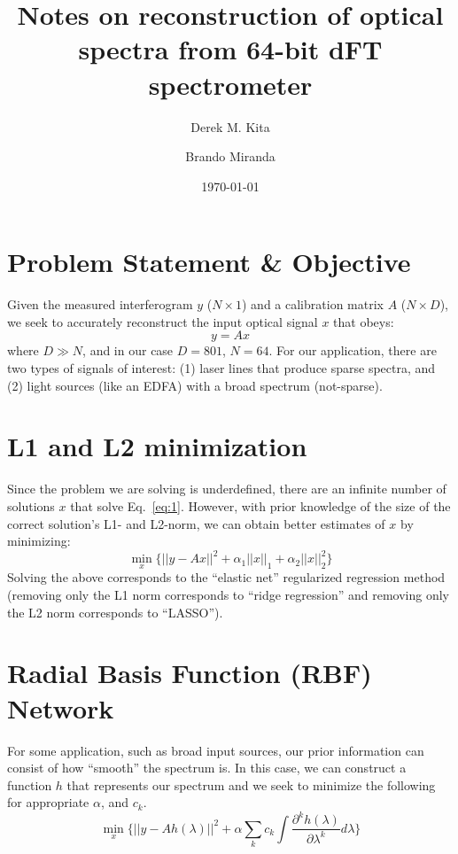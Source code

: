 \documentclass[10pt,a4paper]{article}
\title{Notes on reconstruction of optical spectra from 64-bit dFT spectrometer}
\author[1]{Derek M. Kita}
\author[2]{Brando Miranda}
\affil[1]{Department of Materials Science \& Engineering, Massachusetts Institute of Technology}
\affil[2]{Center for Brains, Minds, and Machines, Massachusetts Institute of Technology}
\date{\today}
\begin{document}
\maketitle

\section*{Problem Statement \& Objective}
Given the measured interferogram $y$ ($N\times 1$) and a calibration matrix $A$ ($N\times D$), we seek to accurately reconstruct the input optical signal $x$ that obeys:
\begin{equation}
y = Ax \label{eq:1}
\end{equation}
where $D\gg N$, and in our case $D=801$, $N=64$.  For our application, there are two types of signals of interest: (1) laser lines that produce sparse spectra, and (2) light sources (like an EDFA) with a broad spectrum (not-sparse).

\section*{L1 and L2 minimization}
Since the problem we are solving is underdefined, there are an infinite number of solutions $x$ that solve Eq.~\ref{eq:1}. However, with prior knowledge of the size of the correct solution's L1- and L2-norm, we can obtain better estimates of $x$ by minimizing:
\begin{equation}
\min_x \Big\{ ||y-Ax||^2 + \alpha_1 ||x||_1 + \alpha_2 ||x||_2^2 \Big\}
\end{equation}
Solving the above corresponds to the ``elastic net'' regularized regression method (removing only the L1 norm corresponds to ``ridge regression'' and removing only the L2 norm corresponds to ``LASSO'').

\section*{Radial Basis Function (RBF) Network}
For some application, such as broad input sources, our prior information can consist of how ``smooth'' the spectrum is.  In this case, we can construct a function $h$ that represents our spectrum and we seek to minimize the following for appropriate $\alpha$, and $c_k$.
\begin{equation}
\min_x \Big\{ ||y-A h(\lambda)||^2 + \alpha \sum_k c_k \int \frac{\partial^k h(\lambda)}{\partial \lambda^k}d\lambda \Big\}
\end{equation}
\end{document}
